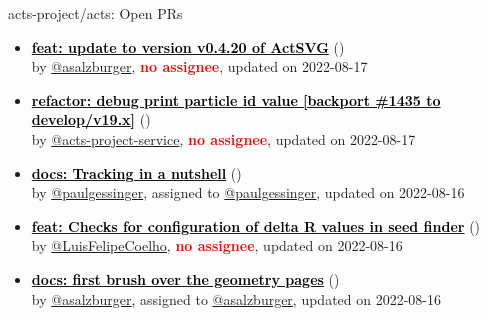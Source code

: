 \begin{frame}[allowframebreaks]{ acts-project/acts: Open PRs
}

  \begin{itemize}
    
    
    \item\propen\textbf{\href{https://github.com/acts-project/acts/pull/1443}{\textcolor{black}{feat: update to version v0.4.20 of ActSVG}}}
    (\href{https://github.com/acts-project/acts/pull/1443}{}) \\
    by \href{https://github.com/asalzburger}{@asalzburger}, {}\textbf{\textcolor{Red}{no assignee}}, updated on 2022-08-17

    \item\propen\textbf{\href{https://github.com/acts-project/acts/pull/1442}{\textcolor{black}{refactor: debug print particle id value [backport \#1435 to develop/v19.x]}}}
    (\href{https://github.com/acts-project/acts/pull/1442}{}) \\
    by \href{https://github.com/acts-project-service}{@acts-project-service}, {}\textbf{\textcolor{Red}{no assignee}}, updated on 2022-08-17

    \item\propen\textbf{\href{https://github.com/acts-project/acts/pull/1399}{\textcolor{black}{docs: Tracking in a nutshell}}}
    (\href{https://github.com/acts-project/acts/pull/1399}{}) \\
    by \href{https://github.com/paulgessinger}{@paulgessinger}, {}assigned to \href{https://github.com/paulgessinger}{@paulgessinger}, updated on 2022-08-16

    \item\propen\textbf{\href{https://github.com/acts-project/acts/pull/1378}{\textcolor{black}{feat: Checks for configuration of delta R values in seed finder}}}
    (\href{https://github.com/acts-project/acts/pull/1378}{}) \\
    by \href{https://github.com/LuisFelipeCoelho}{@LuisFelipeCoelho}, {}\textbf{\textcolor{Red}{no assignee}}, updated on 2022-08-16

    \item\propen\textbf{\href{https://github.com/acts-project/acts/pull/1395}{\textcolor{black}{docs: first brush over the geometry pages}}}
    (\href{https://github.com/acts-project/acts/pull/1395}{}) \\
    by \href{https://github.com/asalzburger}{@asalzburger}, {}assigned to \href{https://github.com/asalzburger}{@asalzburger}, updated on 2022-08-16


\end{itemize}
\end{frame}
